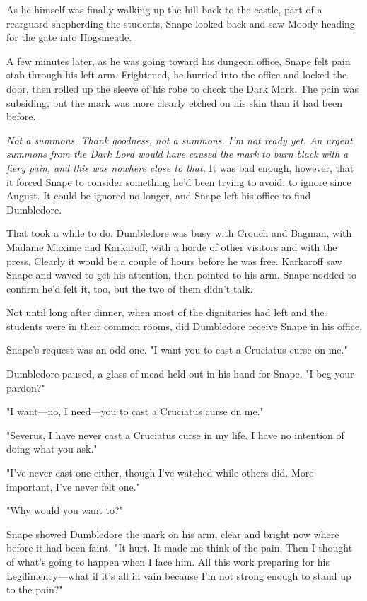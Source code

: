 As he himself was finally walking up the hill back to the castle, part of a rearguard shepherding the students, Snape looked back and saw Moody heading for the gate into Hogsmeade.

A few minutes later, as he was going toward his dungeon office, Snape felt pain stab through his left arm. Frightened, he hurried into the office and locked the door, then rolled up the sleeve of his robe to check the Dark Mark. The pain was subsiding, but the mark was more clearly etched on his skin than it had been before.

\emph{Not a summons. Thank goodness, not a summons. I'm not ready yet. An urgent summons from the Dark Lord would have caused the mark to burn black with a fiery pain, and this was nowhere close to that.} It was bad enough, however, that it forced Snape to consider something he'd been trying to avoid, to ignore since August. It could be ignored no longer, and Snape left his office to find Dumbledore.

That took a while to do. Dumbledore was busy with Crouch and Bagman, with Madame Maxime and Karkaroff, with a horde of other visitors and with the press. Clearly it would be a couple of hours before he was free. Karkaroff saw Snape and waved to get his attention, then pointed to his arm. Snape nodded to confirm he'd felt it, too, but the two of them didn't talk.

Not until long after dinner, when most of the dignitaries had left and the students were in their common rooms, did Dumbledore receive Snape in his office.

Snape's request was an odd one. "I want you to cast a Cruciatus curse on me."

Dumbledore paused, a glass of mead held out in his hand for Snape. "I beg your pardon?"

"I want—no, I need—you to cast a Cruciatus curse on me."

"Severus, I have never cast a Cruciatus curse in my life. I have no intention of doing what you ask."

"I've never cast one either, though I've watched while others did. More important, I've never felt one."

"Why would you want to?"

Snape showed Dumbledore the mark on his arm, clear and bright now where before it had been faint. "It hurt. It made me think of the pain. Then I thought of what's going to happen when I face him. All this work preparing for his Legilimency—what if it's all in vain because I'm not strong enough to stand up to the pain?"


